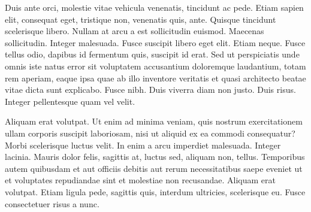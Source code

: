 Duis ante orci, molestie vitae vehicula venenatis, tincidunt ac pede. Etiam sapien elit, consequat eget, tristique non, venenatis quis, ante. Quisque tincidunt scelerisque libero. Nullam at arcu a est sollicitudin euismod. Maecenas sollicitudin. Integer malesuada. Fusce suscipit libero eget elit. Etiam neque. Fusce tellus odio, dapibus id fermentum quis, suscipit id erat. Sed ut perspiciatis unde omnis iste natus error sit voluptatem accusantium doloremque laudantium, totam rem aperiam, eaque ipsa quae ab illo inventore veritatis et quasi architecto beatae vitae dicta sunt explicabo. Fusce nibh. Duis viverra diam non justo. Duis risus. Integer pellentesque quam vel velit.

Aliquam erat volutpat. Ut enim ad minima veniam, quis nostrum exercitationem ullam corporis suscipit laboriosam, nisi ut aliquid ex ea commodi consequatur? Morbi scelerisque luctus velit. In enim a arcu imperdiet malesuada. Integer lacinia. Mauris dolor felis, sagittis at, luctus sed, aliquam non, tellus. Temporibus autem quibusdam et aut officiis debitis aut rerum necessitatibus saepe eveniet ut et voluptates repudiandae sint et molestiae non recusandae. Aliquam erat volutpat. Etiam ligula pede, sagittis quis, interdum ultricies, scelerisque eu. Fusce consectetuer risus a nunc.
